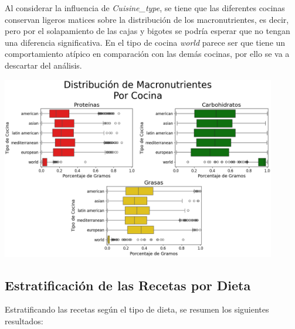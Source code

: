 \documentclass[12pt,a4paper]{article}
\begin{document}
{{            Al considerar la influencia de \emph{Cuisine\_type}, se tiene que las diferentes 
            cocinas conservan ligeros matices sobre la distribución de los macronutrientes, es 
            decir, pero por el solapamiento de las cajas y bigotes se podría esperar que no tengan 
            una diferencia significativa. En el tipo de cocina \emph{world} parece ser que tiene 
            un comportamiento atípico en comparación con las demás cocinas, por ello se va a 
            descartar del análisis.

            \begin{center}
                \includegraphics[width=0.9\textwidth]{Resources/EDA/VisionGeneral_2.png}
            \end{center}
        }

        \subsection{Estratificación de las Recetas por Dieta}
        {
            Estratificando las recetas según el tipo de dieta, se resumen 
            los siguientes resultados:
        }
    }

    \newpage
\end{document}
